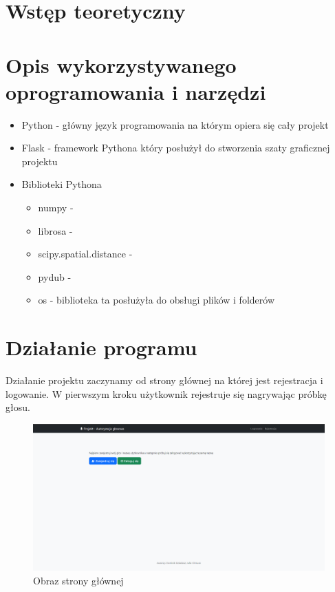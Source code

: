\section{Wstęp teoretyczny}



\section{Opis wykorzystywanego oprogramowania i narzędzi}
\begin{itemize}
	\item Python - główny język programowania na którym opiera się cały projekt
	\item Flask - framework Pythona który posłużył do stworzenia szaty graficznej projektu
	\item Biblioteki Pythona
	\begin{itemize}
		\item numpy - 
		\item librosa - 
		\item scipy.spatial.distance - 
		\item pydub - 
		\item os - biblioteka ta posłużyła do obsługi plików i folderów
		
	\end{itemize}	
\end{itemize}	



\section{Działanie programu}
Działanie projektu zaczynamy od strony głównej na której jest rejestracja i logowanie. W pierwszym kroku użytkownik rejestruje się nagrywając próbkę głosu. 

\begin{figure}[H]
	\centering
	\includegraphics[width=\linewidth]{src/images/strona_glowna.png}
	\caption{Obraz strony głównej}
\end{figure}

